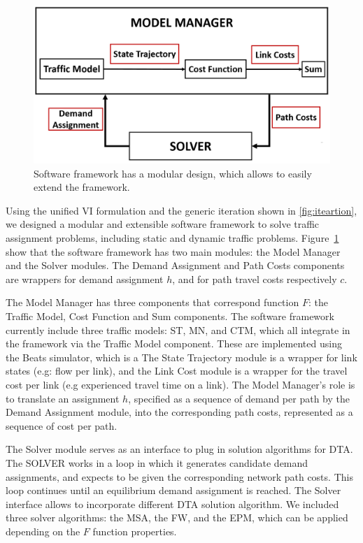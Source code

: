 \begin{figure}[h]
    \centering
    \includegraphics[width=\linewidth]{figs/Software_Block_Diagram.PNG}
    \caption{Software framework has a modular design, which allows to easily extend the framework.}
    \label{fig:Block_Diagram}
\end{figure}

Using the unified VI formulation and the generic iteration shown in \ref{fig:iteartion}, we designed a modular and extensible software framework to solve traffic assignment problems, including static and dynamic traffic problems. Figure~\ref{fig:Block_Diagram} show that the software framework has two main modules: the Model Manager and the Solver modules. The Demand Assignment and Path Costs components are wrappers for demand assignment $h$, and for path travel costs respectively $c$.

The Model Manager has three components that correspond function $F$: the Traffic Model, Cost Function and Sum components. The software framework currently include three traffic models: ST, MN, and CTM, which all integrate in the framework via the Traffic Model component. These are implemented using the Beats simulator, which is a  The State Trajectory module is a wrapper for link states (e.g: flow per link), and the Link Cost module is a wrapper for the travel cost per link (e.g experienced travel time on a link). The Model Manager's role is to translate an assignment $h$, specified as a sequence of demand per path by the Demand Assignment module, into the corresponding path costs, represented as a sequence of cost per path.

The Solver module serves as an interface to plug in solution algorithms for DTA. The SOLVER works in a loop in which it generates candidate demand assignments, and expects to be given the corresponding network path costs. This loop continues until an equilibrium demand assignment is reached. The Solver interface allows to incorporate different DTA solution algorithm. We included three solver algorithms: the MSA, the FW, and the EPM, which can be applied depending on the $F$ function properties. 

